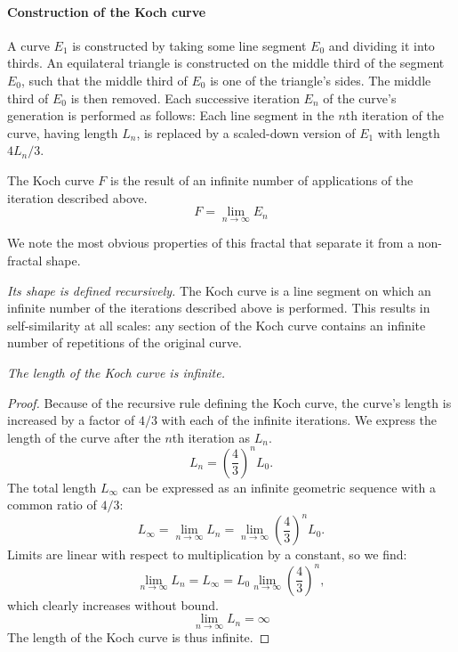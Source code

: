 \paragraph{Construction of the Koch curve} A curve $E_1$ is constructed by taking some line segment $E_0$ and dividing it into thirds. An equilateral triangle is constructed on the middle third of the segment $E_0$, such that the middle third of $E_0$ is one of the triangle's sides. The middle third of $E_0$ is then removed. Each successive iteration $E_n$ of the curve's generation is performed as follows: Each line segment in the $n$th iteration of the curve, having length $L_n$, is replaced by a scaled-down version of $E_1$ with length $4L_n/3$. 

The Koch curve $F$ is the result of an infinite number of applications of the iteration described above.
\begin{equation}\label{limitofE_n}
	F = \lim_{n \to \infty}E_n
\end{equation}

We note the most obvious properties of this fractal that separate it from a non-fractal shape. 

\begin{myobs}\textit{Its shape is defined recursively.} The Koch curve is a line segment on which an infinite number of the iterations described above is performed. This results in self-similarity at all scales: any section of the Koch curve contains an infinite number of repetitions of the original curve.\end{myobs}

\begin{myobs}\textit{The length of the Koch curve is infinite.}\end{myobs}

\begin{proof}
Because of the recursive rule defining the Koch curve, the curve's length is increased by a factor of $ 4/3 $ with each of the infinite iterations. We express the length of the curve after the $n$th iteration as $L_n$. 
\begin{equation}
	L_n = \left(\frac{4}{3}\right)^n L_0.
\end{equation}
The total length $L_\infty$ can be expressed as an infinite geometric sequence with a common ratio of $ 4/3 $:
\begin{equation}
	L_\infty = \lim_{n \to \infty}L_n = \lim_{n \to \infty}\left(\frac{4}{3}\right)^n L_0.
\end{equation}
Limits are linear with respect to multiplication by a constant, so we find:
\begin{equation}
	\lim_{n \to \infty}L_n = L_\infty = L_0 \lim_{n \to \infty} \left(\frac{4}{3}\right)^n,
\end{equation}
which clearly increases without bound.
\begin{equation}
	\lim_{n \to \infty}L_n = \infty 
\end{equation}
The length of the Koch curve is thus infinite.
\end{proof}

